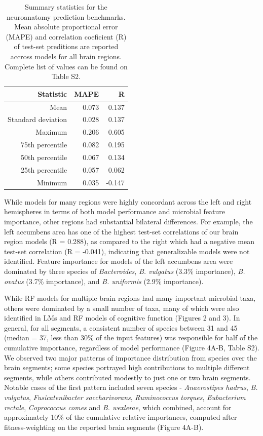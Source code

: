 \documentclass{article}
\begin{document}
\begin{table}[!h]
    \begin{center}
    \begin{tabular}{|r|r|r|}
      \hline\hline
      \textbf{Statistic} & \textbf{MAPE} & \textbf{R} \\\hline
      Mean & 0.073 & 0.137 \\
      Standard deviation & 0.028 & 0.137 \\
      Maximum & 0.206 & 0.605 \\
      75th percentile & 0.082 & 0.195 \\
      50th percentile & 0.067 & 0.134 \\
      25th percentile & 0.057 & 0.062 \\
      Minimum & 0.035 & -0.147 \\\hline\hline
    \end{tabular}
    \caption{\label{tab:neuro}Summary statistics for the neuroanatomy prediction benchmarks.
    Mean absolute proportional error (MAPE) and correlation coeficient (R)
    of test-set preditions are reported accross models for all brain regions.
    Complete list of values can be found on Table S2.}
    \end{center}
\end{table}

While models for many regions were highly concordant across the
left and right hemispheres in terms of both model performance and
microbial feature importance, other regions had substantial
bilateral differences. For example, the left accumbens area
has one of the highest test-set correlations of our
brain region models (R = 0.288), as compared to the right which
had a negative mean test-set correlation (R = -0.041),
indicating that generalizable models were not identified.
Feature importance for models of the left accumbens area were dominated
by three species of \emph{Bacteroides}, \emph{B. vulgatus} (3.3\% importance),
\emph{B. ovatus} (3.7\% importance), and
\emph{B. uniformis} (2.9\% importance).

While RF models for multiple brain regions had many important microbial taxa,
others were dominated by a small number of taxa, many of which
were also identified in LMs and RF models of cognitive function (Figures 2 and 3). 
In general, for all segments, a consistent number of species between 31 and 45 (median = 37, less than 30\% of the input features)
was responsible for half of the cumulative importance,
regardless of model performance (Figure 4A-B, Table S2).
We observed two major patterns of importance distribution from
species over the brain segments; some species portrayed high contributions
to multiple different segments, while others contributed modestly to
just one or two brain segments. Notable cases of the first pattern
included seven species - \emph{Anaerostipes hadrus}, \emph{B.
vulgatus}, \emph{Fusicatenibacter saccharivorans}, \emph{Ruminococcus
torques}, \emph{Eubacterium rectale}, \emph{Coprococcus comes} and
\emph{B. wexlerae}, which combined, account for approximately 10\% of the cumulative relative importances,
computed after fitness-weighting on the reported brain segments (Figure 4A-B).
\end{document}
